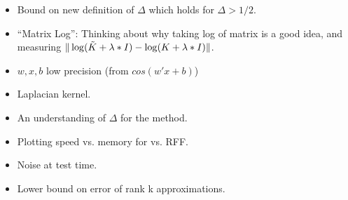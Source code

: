 \begin{itemize}
	\item Bound on new definition of $\Delta$ which holds for $\Delta > 1/2$.
	\item ``Matrix Log'': Thinking about why taking log of matrix is a good idea, and measuring $\|\log(\tilde{K} + \lambda * I) - \log(K + \lambda * I)\|$.
	\item $w,x,b$ low precision (from $cos(w'x + b)$)
	\item Laplacian kernel.
	\item An understanding of $\Delta$ for the \Nystrom method.
	\item Plotting speed vs. memory for \Nystrom vs. RFF.
	\item Noise at test time.
	\item Lower bound on error of rank k approximations.
\end{itemize}